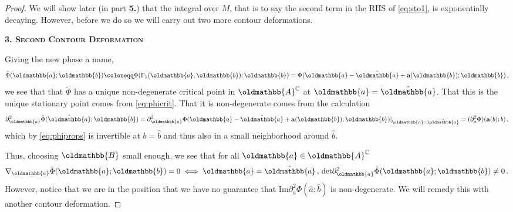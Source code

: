 \documentclass[
	fontsize=11pt, 
	twoside=false, 
	abstract=true, 
	a4paper,
]{scrartcl}
\newcommand{\RR}{\mathbb{R}}
\newcommand{\CC}{\mathbb{C}}
\newcommand{\dd}{\mathrm{d}}
\newcommand{\del}{\partial}
\newcommand{\td}[1]{\tilde{#1}}
\newcommand{\id}{\mathrm{id}}
\newcommand{\mf}[1]{\oldmathbb{#1}}
\newcommand{\bsc}[1]{\textbf{\ebgaramond\textsc{#1}}}
\begin{document}
\begin{proof}

We will show later (in part \bsc{5.}) that the integral over $M$, that is to say the second term in the RHS of \cref{eq:sto1}, is exponentially decaying. However, before we do so we will carry out two more contour deformations.

	\bsc{3. Second Contour Deformation}

	Giving the new phase a name, 
	\begin{equation}\label{eq:defphitd}
		\td{\Phi}(\mf{a};\mf{b})\coloneqq \Phi(\Gamma_1(\mf{a},\mf{b});\mf{b}) = \Phi(\mf{a}-\hat{\mf{a}}+\mathbf{a}(\mf{b});\mf{b})\,,%
	\end{equation}
	we see that that $\td{\Phi}$ has a unique non-degenerate critical point in $\mf{A}^\CC$ at $\mf{a}=\hat{\mf{a}}$. That this is the unique stationary point comes from \cref{eq:phicrit}. That it is non-degenerate comes from the calculation
	\begin{equation*}
		\del_{\mf{a}}^2\td{\Phi}(\hat{\mf{a}};\mf{b}) = \del_{\mf{a}}^2\Phi(\mf{a}-\hat{\mf{a}}+\mathbf{a}(\mf{b});\mf{b})\vert_{\mf{a}=\hat{\mf{a}}} = (\del_{a}^2\Phi)(\mathbf{a}(b);b)\,,
	\end{equation*}
	which by \cref{eq:phiprops} is invertible at $b = \hat b$ and thus also in a small neighborhood around $\hat b$.

	Thus, choosing $\mf{B}$ small enough, we see that for all $\mf{a} \in \mf{A}^\CC$
	\begin{equation}\label{eq:halfclaim}
		\nabla_{\mf{a}}\td{\Phi}(\mf{a};\mf{b}) = 0 \iff \mf{a}=\hat{\mf{a}}\,,\, \mathrm{det}\del_{\mf{a}}^2 \td{\Phi}(\mf{a};\mf{b}) \neq 0\,.
	\end{equation}
	However, notice that we are in the position that we have no guarantee that $\mathrm{Im}\del_a^2\Phi(\hat a;\hat b)$ is 
	non-degenerate. We will remedy this with another contour deformation.


\end{proof}
\end{document}
